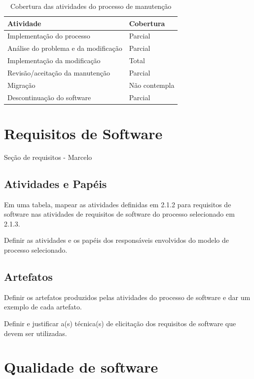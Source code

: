    \begin{table}[htb]
      \begin{center}
        \begin{tabular}{| p{6cm} | l |}
        \hline
        \textbf{Atividade} & \textbf{Cobertura} \\ \hline
        Implementação do processo & Parcial \\ \hline
        Análise do problema e da modificação & Parcial \\ \hline
        Implementação da modificação & Total\\ \hline
        Revisão/aceitação da manutenção & Parcial \\ \hline
        Migração & Não contempla \\ \hline
        Descontinuação do software & Parcial \\ \hline
        \end{tabular}
      \end{center}
    \caption{Cobertura das atividades do processo de manutenção}
    \end{table}

\section{Requisitos de Software}
\label{sec:requisitos}

\large{Seção de requisitos - Marcelo}

\subsection{Atividades e Papéis}

Em uma tabela, mapear as atividades definidas em 2.1.2
para requisitos de software nas atividades de requisitos de
software do processo selecionado em 2.1.3.


Definir as atividades e os papéis dos responsáveis
envolvidos do modelo de processo selecionado.

\subsection{Artefatos}

Definir os artefatos produzidos pelas atividades do processo
de software e dar um exemplo de cada artefato.

Definir e justificar a(s) técnica(s) de elicitação dos
requisitos de software que devem ser utilizadas.

\section{Qualidade de software}
\label{sec:qualisoftware}


